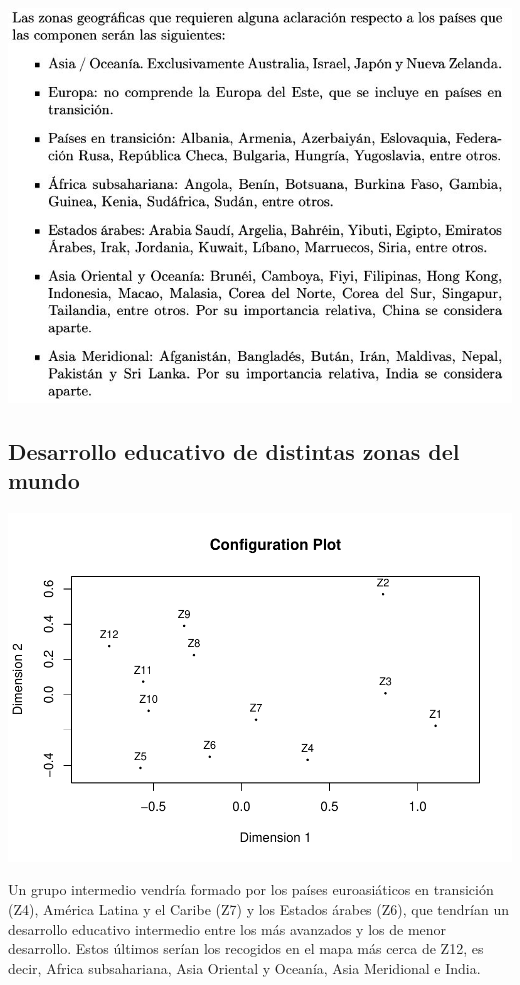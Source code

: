 \documentclass[]{article}
\begin{document}
\hypertarget{right}{}
\includegraphics[width=1\linewidth]{images/geogra}

\subsection{Desarrollo educativo de distintas zonas del
mundo}\label{desarrollo-educativo-de-distintas-zonas-del-mundo-13}

\hypertarget{left}{}
\includegraphics{Clase-4_files/figure-latex/unnamed-chunk-25-1.pdf}

\hypertarget{right}{}
Un grupo intermedio vendría formado por los países euroasiáticos en
transición (Z4), América Latina y el Caribe (Z7) y los Estados árabes
(Z6), que tendrían un desarrollo educativo intermedio entre los más
avanzados y los de menor desarrollo. Estos últimos serían los recogidos
en el mapa más cerca de Z12, es decir, Africa subsahariana, Asia
Oriental y Oceanía, Asia Meridional e India.
\end{document}
